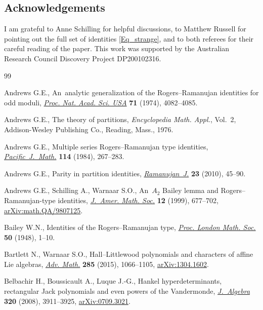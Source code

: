 \documentclass[pdftex]{sigma}
\numberwithin{equation}{section}
\begin{document}
\subsection*{Acknowledgements}
I am grateful to Anne Schilling for helpful discussions, to
Matthew Russell for pointing out the full set of identities \eqref{Eq_strange},
and to both referees for their careful reading of the paper.
This work was supported by the Australian Research Council
Discovery Project DP200102316.

\begin{thebibliography}{99}
\footnotesize\itemsep=0pt

Andrews G.E., An~analytic generalization of the {R}ogers--{R}amanujan
 identities for odd moduli,
 \href{https://doi.org/10.1073/pnas.71.10.4082}{\textit{Proc. Nat. Acad. Sci.
 USA}} \textbf{71} (1974), 4082--4085.

Andrews G.E., The theory of partitions, \textit{Encyclopedia Math. Appl.},
 Vol.~2, Addison-Wesley Publishing Co., Reading, Mass., 1976.

Andrews G.E., Multiple series {R}ogers--{R}amanujan type identities,
 \href{https://doi.org/10.2140/pjm.1984.114.267}{\textit{Pacific~J.~Math.}}
 \textbf{114} (1984), 267--283.

Andrews G.E., Parity in partition identities,
 \href{https://doi.org/10.1007/s11139-008-9150-0}{\textit{Ramanujan~J.}}
 \textbf{23} (2010), 45--90.

Andrews G.E., Schilling A., Warnaar S.O., An~{$A_2$} {B}ailey lemma and
 {R}ogers--{R}amanujan-type identities,
 \href{https://doi.org/10.1090/S0894-0347-99-00297-0}{\textit{J.~Amer. Math.
 Soc.}} \textbf{12} (1999), 677--702,
 \href{http://arxiv.org/abs/math.QA/9807125}{arXiv:math.QA/9807125}.

Bailey W.N., Identities of the {R}ogers--{R}amanujan type,
 \href{https://doi.org/10.1112/plms/s2-50.1.1}{\textit{Proc. London Math.
 Soc.}} \textbf{50} (1948), 1--10.

Bartlett N., Warnaar S.O., Hall--{L}ittlewood polynomials and characters of
 affine {L}ie algebras,
 \href{https://doi.org/10.1016/j.aim.2015.08.011}{\textit{Adv. Math.}}
 \textbf{285} (2015), 1066--1105,
 \href{http://arxiv.org/abs/1304.1602}{arXiv:1304.1602}.

Belbachir H., Boussicault A., Luque J.-G., Hankel hyperdeterminants, rectangular
 {J}ack polynomials and even powers of the {V}andermonde,
 \href{https://doi.org/10.1016/j.jalgebra.2008.06.015}{\textit{J.~Algebra}}
 \textbf{320} (2008), 3911--3925,
 \href{http://arxiv.org/abs/0709.3021}{arXiv:0709.3021}.


\end{thebibliography}
\end{document}
